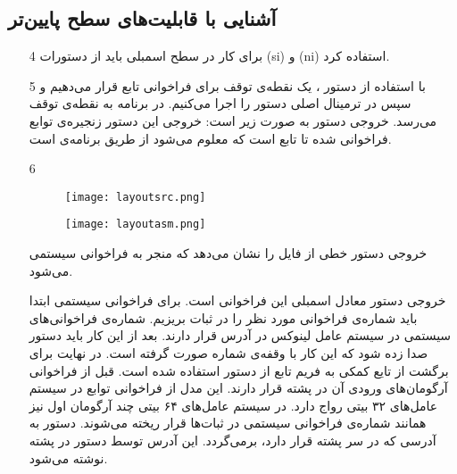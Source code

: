 \subsection*{آشنایی با قابلیت‌های سطح پایین‌تر}
\begin{itemize}
	\item[4]
	برای کار در سطح اسمبلی باید از دستورات 
	 (si) و  (ni) 
	استفاده کرد.
	
	\lr{}
	
	\item[5]
	با استفاده از دستور 
	، 
	یک نقطه‌ی توقف برای فراخوانی تابع 
	قرار می‌دهیم و سپس در ترمینال اصلی دستور 
	را اجرا می‌کنیم. در 
	برنامه به نقطه‌ی توقف می‌رسد. خروجی دستور 
	به صورت زیر است:
	\lr{} 
	خروجی این دستور زنجیره‌ی توابع فراخوانی شده تا تابع 
	است که معلوم می‌شود از طریق برنامه‌ی 
	است.
	
	\item[6]
	\begin{figure}[H]
		\centering
		\texttt{[image: layoutsrc.png]}
	\end{figure}
	\begin{figure}[H]
		\centering
		\texttt{[image: layoutasm.png]}
	\end{figure}
	
	خروجی دستور 
	خطی از فایل 
	را نشان می‌دهد که منجر به فراخوانی سیستمی 
	می‌شود.
	
	خروجی دستور 
	معادل اسمبلی این فرا‌خوانی است. برای فراخوانی سیستمی ابتدا باید شماره‌ی فراخوانی مورد نظر را در ثبات 
	بریزیم. شماره‌ی فراخوانی‌های سیستمی در سیستم‌ عامل لینوکس در آدرس 
	قرار دارند. بعد از این کار باید دستور 
	صدا زده شود که این کار با وقفه‌ی شماره 
	صورت گرفته است. در نهایت برای برگشت از تایع کمکی 
	به فریم تابع 
	از دستور 
	استفاده شده است.
	قبل از فراخوانی 
	آرگومان‌های ورودی آن در پشته قرار دارند. این مدل از فراخوانی توابع در سیستم عامل‌های ۳۲ بیتی رواج دارد. در سیستم عامل‌های ۶۴ بیتی چند آرگومان اول نیز همانند شماره‌ی فراخوانی سیستمی در ثبات‌ها قرار ریخته می‌شوند. دستور 
	به آدرسی که در سر پشته قرار دارد، برمی‌گردد. این آدرس توسط دستور 
	در پشته نوشته می‌شود.
\end{itemize}